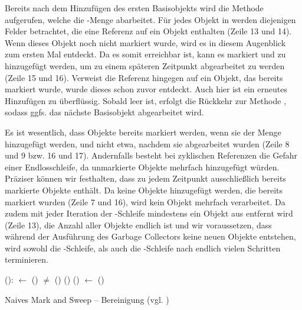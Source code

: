 Bereits nach dem Hinzufügen des ersten Basisobjekts wird die Methode  aufgerufen, welche die -Menge abarbeitet.
Für jedes Objekt in  werden diejenigen Felder betrachtet, die eine Referenz auf ein Objekt enthalten (Zeile 13 und 14).
Wenn dieses Objekt noch nicht markiert wurde, wird es in diesem Augenblick zum ersten Mal entdeckt.
Da es somit erreichbar ist, kann es markiert und zu  hinzugefügt werden, um zu einem späteren Zeitpunkt abgearbeitet zu werden (Zeile 15 und 16).
Verweist die Referenz hingegen auf ein Objekt, das bereits markiert wurde, wurde dieses schon zuvor entdeckt.
Auch hier ist ein erneutes Hinzufügen zu  überflüssig.
Sobald  leer ist, erfolgt die Rückkehr zur Methode , sodass ggfs. das nächste Basisobjekt abgearbeitet wird.


Es ist wesentlich, dass Objekte bereits markiert werden, wenn sie der Menge  hinzugefügt werden, und nicht etwa, nachdem sie abgearbeitet wurden (Zeile 8 und 9 bzw. 16 und 17).
Andernfalls besteht bei zyklischen Referenzen die Gefahr einer Endlosschleife, da unmarkierte Objekte mehrfach hinzugefügt würden.
Präziser können wir festhalten, dass  zu jedem Zeitpunkt ausschließlich bereits markierte Objekte enthält.
Da keine Objekte hinzugefügt werden, die bereits markiert wurden (Zeile 7 und 16), wird kein Objekt mehrfach verarbeitet.
Da zudem mit jeder Iteration der \WHILE-Schleife mindestens ein Objekt aus  entfernt wird (Zeile 13), die Anzahl aller Objekte endlich ist und wir voraussetzen, dass während der Ausführung des Garbage Collectors keine neuen Objekte entstehen, wird sowohl die \WHILE-Schleife, als auch die \FOREACH-Schleife nach endlich vielen Schritten terminieren.

\begin{algorithm}
\begin{algorithmic}[1]
	\State {}():
	\State \quad {} $\gets$ ()
	\State \quad \WHILE {} $\neq$ \Null
	\State \quad \quad \IF {}()
	\State \quad \quad \quad {}()
	\State \quad \quad \ELSE {}()
	\State \quad \quad {} $\gets$ ()
\end{algorithmic}
\caption[Naives Mark and Sweep -- Bereinigung]{Naives Mark and Sweep -- Bereinigung (vgl. \cite[Kap. 2.2]{jones-lins})}
\label{algo:naive-sweep}
\end{algorithm}

